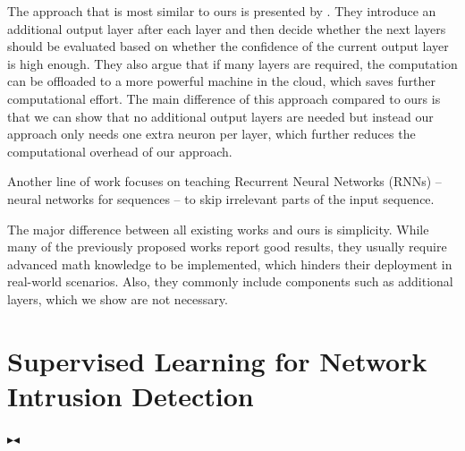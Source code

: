 \documentclass[conference]{IEEEtran}
\newcommand{\mynote}[3]{
    \fbox{\bfseries\sffamily\scriptsize#1}
    {\small$\blacktriangleright$\textsf{\emph{\color{#3}{#2}}}$\blacktriangleleft$}}
\newcommand{\todo}[1]{\mynote{TODO}{#1}{red}}
\begin{document}
The approach that is most similar to ours is presented by \cite{leroux_resource-constrained_2015,leroux_cascading_2017}. They introduce an additional output layer after each layer and then decide whether the next layers should be evaluated based on whether the confidence of the current output layer is high enough. They also argue that if many layers are required, the computation can be offloaded to a more powerful machine in the cloud, which saves further computational effort. The main difference of this approach compared to ours is that we can show that no additional output layers are needed but instead our approach only needs one extra neuron per layer, which further reduces the computational overhead of our approach.

Another line of work \cite{seo_neural_2018,yu_learning_2017, graves_adaptive_2017, bachl_sparseids_2020} focuses on teaching Recurrent Neural Networks (RNNs) -- neural networks for sequences -- to skip irrelevant parts of the input sequence.

The major difference between all existing works and ours is simplicity. While many of the previously proposed works report good results, they usually require advanced math knowledge to be implemented, which hinders their deployment in real-world scenarios. Also, they commonly include components such as additional layers, which we show are not necessary. 

\section{Supervised Learning for Network Intrusion Detection}

\todo{Max: Add missing references}
\end{document}

